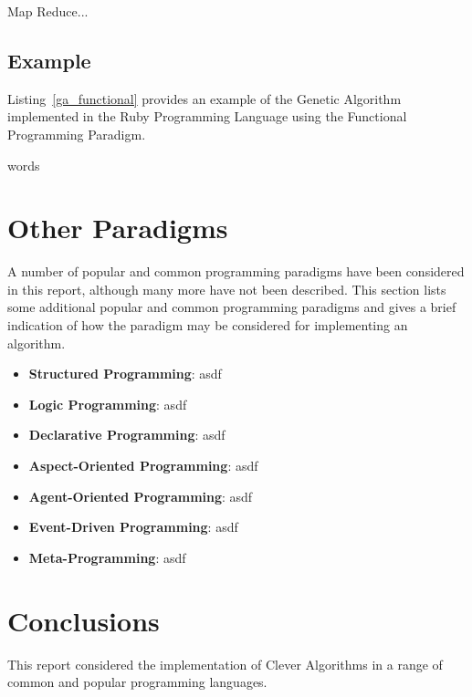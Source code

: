 \documentclass[a4paper, 11pt]{article}
\begin{document}
Map Reduce...

\subsection{Example}
Listing~\ref{ga_functional} provides an example of the Genetic Algorithm implemented in the Ruby Programming Language using the Functional Programming Paradigm.

words




\section{Other Paradigms}
A number of popular and common programming paradigms have been considered in this report, although many more have not been described. This section lists some additional popular and common programming paradigms and gives a brief indication of how the paradigm may be considered for implementing an algorithm.

\begin{itemize}
	\item \textbf{Structured Programming}: asdf
	\item \textbf{Logic Programming}: asdf
	\item \textbf{Declarative Programming}: asdf
	\item \textbf{Aspect-Oriented Programming}: asdf
	\item \textbf{Agent-Oriented Programming}: asdf
	\item \textbf{Event-Driven Programming}: asdf
	\item \textbf{Meta-Programming}: asdf
\end{itemize}

\section{Conclusions}
\label{sec:conclusions}
This report considered the implementation of Clever Algorithms in a range of common and popular programming languages. 




\end{document}
